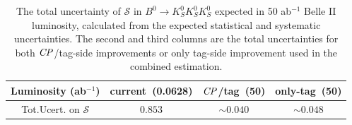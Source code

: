 \begin{table}[htpb]
	\centering
	\caption{The total uncertainty of $\mathcal{S}$ in $B^0 \to K_S^0  K_S^0  K_S^0$ expected in 50 ab$^{-1}$ Belle II luminosity, calculated from the expected statistical and systematic uncertainties. The second and third columns are the total uncertainties for both $\it{CP}$/tag-side improvements or only tag-side improvement used in the combined estimation.}
	\label{tab:err_full}
	\begin{tabular}{c|c|c |c}
		\hline
		Luminosity (ab$^{-1}$) & current~(0.0628)&$\it{CP}$/tag~(50) & only-tag~(50)\\
		\hline
		Tot.Ucert. on $\mathcal{S}$ & $0.853$ & $\sim0.040$ & $\sim0.048$ \\
		\hline
	\end{tabular}
\end{table}

